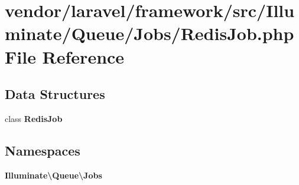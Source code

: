 \section{vendor/laravel/framework/src/\+Illuminate/\+Queue/\+Jobs/\+Redis\+Job.php File Reference}
\label{_redis_job_8php}
\subsection*{Data Structures}
\begin{DoxyCompactItemize}
\item 
class {\bf Redis\+Job}
\end{DoxyCompactItemize}
\subsection*{Namespaces}
\begin{DoxyCompactItemize}
\item 
 {\bf Illuminate\textbackslash{}\+Queue\textbackslash{}\+Jobs}
\end{DoxyCompactItemize}
